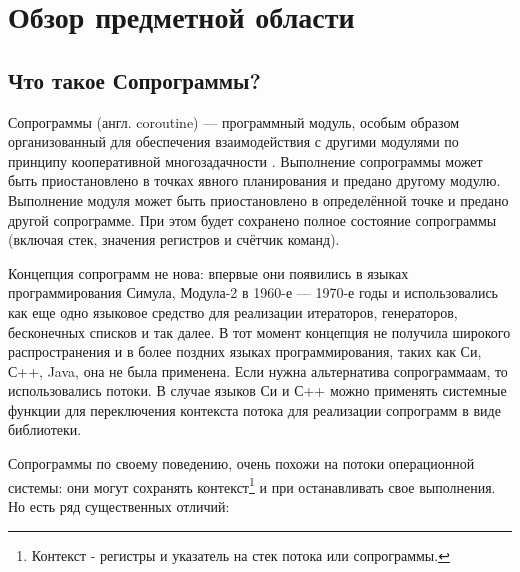 \section{Обзор предметной области}
	\subsection{Что такое Сопрограммы?}
	Сопрограммы (англ. coroutine) — программный модуль, особым образом организованный для обеспечения взаимодействия с другими модулями по принципу кооперативной многозадачности \cite{coroutine}. Выполнение сопрограммы может быть
	приостановлено в точках явного планирования и предано другому модулю. Выполнение модуля может быть приостановлено в
	определённой точке и предано другой сопрограмме. При этом будет сохранено полное состояние сопрограммы (включая
	стек, значения регистров и счётчик команд).
	\par
	Концепция сопрограмм не нова: впервые они появились в языках программирования Симула\cite{simula},
	Модула-2\cite{modula} в 1960-е — 1970-е годы и использовались как еще одно языковое средство для
	реализации итераторов, генераторов, бесконечных списков и так далее. В
	тот момент концепция не получила широкого распространения и в более поздних языках
	программирования, таких как Си, С++, Java, она не была применена. Если нужна
	альтернатива сопрограммаам, то использовались потоки. В случае языков Си и С++ можно применять 
	системные функции для переключения контекста потока для реализации сопрограмм в виде библиотеки.
	\par
	Сопрограммы по своему поведению, очень похожи на потоки операционной системы: они могут сохранять
	контекст\footnote{Контекст - регистры и указатель на стек потока или сопрограммы.} и при останавливать свое
	выполнения. Но есть ряд существенных отличий:
